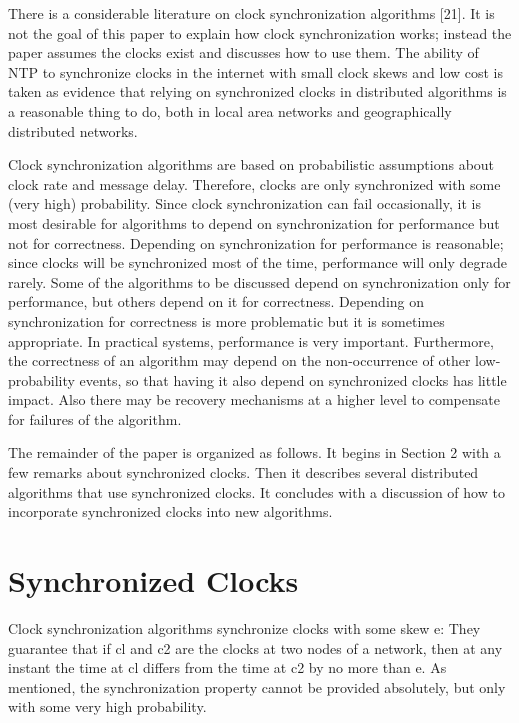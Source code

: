 \documentclass[a4paper,11pt,notitlepage,twoside,openright]{article}
\begin{document}
There is a considerable literature on clock synchronization algorithms
{[}21{]}. It is not the goal of this paper to explain how clock
synchronization works; instead the paper assumes the clocks exist and
discusses how to use them. The ability of NTP to synchronize clocks in
the internet with small clock skews and low cost is taken as evidence
that relying on synchronized clocks in distributed algorithms is a
reasonable thing to do, both in local area networks and geographically
distributed networks.

Clock synchronization algorithms are based on probabilistic assumptions
about clock rate and message delay. Therefore, clocks are only
synchronized with some (very high) probability. Since clock
synchronization can fail occasionally, it is most desirable for
algorithms to depend on synchronization for performance but not for
correctness. Depending on synchronization for performance is reasonable;
since clocks will be synchronized most of the time, performance will
only degrade rarely. Some of the algorithms to be discussed depend on
synchronization only for performance, but others depend on it for
correctness. Depending on synchronization for correctness is more
problematic but it is sometimes appropriate. In practical systems,
performance is very important. Furthermore, the correctness of an
algorithm may depend on the non-occurrence of other low-probability
events, so that having it also depend on synchronized clocks has little
impact. Also there may be recovery mechanisms at a higher level to
compensate for failures of the algorithm.

The remainder of the paper is organized as follows. It begins in Section
2 with a few remarks about synchronized clocks. Then it describes
several distributed algorithms that use synchronized clocks. It
concludes with a discussion of how to incorporate synchronized clocks
into new algorithms.

\hypertarget{synchronized-clocks}{%
\section{Synchronized Clocks}\label{synchronized-clocks}}

Clock synchronization algorithms synchronize clocks with some skew e:
They guarantee that if cl and c2 are the clocks at two nodes of a
network, then at any instant the time at cl differs from the time at c2
by no more than e. As mentioned, the synchronization property cannot be
provided absolutely, but only with some very high probability.
\end{document}
